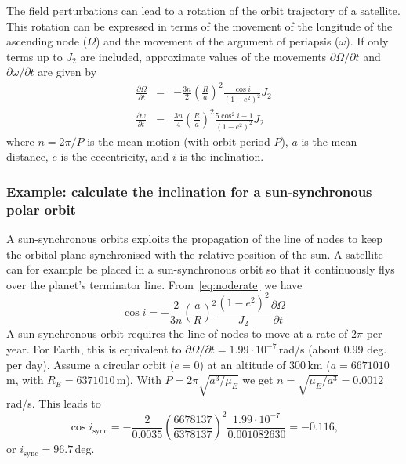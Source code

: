 \documentclass[Orbiter Technical Reference.tex]{subfiles}
\begin{document}
The field perturbations can lead to a rotation of the orbit trajectory of a satellite. This rotation can be expressed in terms of the movement of the longitude of the ascending node ($\Omega$) and the movement of the argument of periapsis ($\omega$).
If only terms up to $J_2$ are included, approximate values of the movements $\partial\Omega/\partial t$ and $\partial\omega/\partial t$ are given by
\begin{eqnarray}
\frac{\partial\Omega}{\partial t} &=& -\frac{3 n}{2} \left(\frac{R}{a}\right)^2 \frac{\cos i}{(1-e^2)^2} J_2 \label{eq:noderate} \\
\frac{\partial\omega}{\partial t} &=& \frac{3 n}{4} \left(\frac{R}{a}\right)^2 \frac{5 \cos^2 i - 1}{(1-e^2)^2} J_2
\end{eqnarray}
where $n=2\pi/P$ is the mean motion (with orbit period $P$), $a$ is the mean distance, $e$ is the eccentricity, and $i$ is the inclination.

\subsubsection*{Example: calculate the inclination for a sun-synchronous polar orbit}
A sun-synchronous orbits exploits the propagation of the line of nodes to keep the orbital plane synchronised with the relative position of the sun. A satellite can for example be placed in a sun-synchronous orbit so that it continuously flys over the planet's terminator line.
From~\ref{eq:noderate} we have
\begin{equation}
\cos i = -\frac{2}{3 n} \left(\frac{a}{R} \right)^2 \frac{(1-e^2)^2}{J_2} \frac{\partial\Omega}{\partial t}
\end{equation}
A sun-synchronous orbit requires the line of nodes to move at a rate of $2\pi$ per year. For Earth, this is equivalent to $\partial\Omega/\partial t = 1.99\cdot 10^{-7}$\,rad/s (about $0.99$ deg. per day). Assume a circular orbit ($e=0$) at an altitude of 300\,km
($a = 6 671 010$\,m, with $R_E = 6 371 010$\,m).
With $P = 2\pi\sqrt{a^3/\mu_E}$ we get $n = \sqrt{\mu_E/a^3} = 0.0012$\,rad/s. This leads to
\begin{equation}
\cos i_\text{sync} = -\frac{2}{0.0035} \left(\frac{6 678 137}{6 378 137}\right)^2 \frac{1.99\cdot 10^{-7}}{0.001082630} = -0.116,
\end{equation}
or $i_\text{sync} = 96.7$\,deg.
%
%
\end{document}
